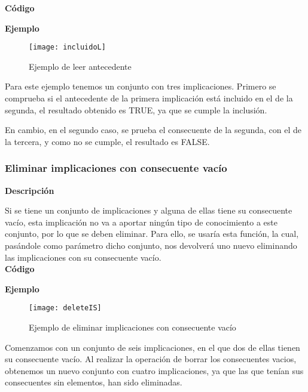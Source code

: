     \textbf{C\'odigo}

    
    \bigskip

    \textbf{Ejemplo}

    \begin{figure}[H]
        \centering
        \texttt{[image: incluidoL]}
        \caption{Ejemplo de leer antecedente}
        \label{fig:incluidoL}
    \end{figure}

    Para este ejemplo tenemos un conjunto con tres implicaciones. Primero se comprueba si el antecedente de la primera implicaci\'on 
    est\'a incluido en el de la segunda, el resultado obtenido es TRUE, ya que se cumple la inclusi\'on.

    En cambio, en el segundo caso, se prueba el consecuente de la segunda, con el de la tercera, y como no se cumple, el resultado es FALSE.



\subsubsection{Eliminar implicaciones con consecuente vac\'io}

    \textbf{Descripci\'on}

    Si se tiene un conjunto de implicaciones y alguna de ellas tiene su consecuente vac\'io, esta implicaci\'on no va a 
    aportar ning\'un tipo de conocimiento a este conjunto, por lo que se deben eliminar. Para ello, se usar\'ia esta funci\'on, 
    la cual, pas\'andole como par\'ametro dicho conjunto, nos devolver\'a uno nuevo eliminando las implicaciones con su consecuente 
    vac\'io.
    \\


    \textbf{C\'odigo}

    
    \bigskip

    \textbf{Ejemplo}

    \begin{figure}[H]
        \centering
        \texttt{[image: deleteIS]}
        \caption{Ejemplo de eliminar implicaciones con consecuente vac\'io}
        \label{fig:deleteIS}
    \end{figure}

    Comenzamos con un conjunto de seis implicaciones, en el que dos de ellas tienen su consecuente vac\'io. Al realizar la 
    operaci\'on de borrar los consecuentes vacios, obtenemos un nuevo conjunto con cuatro implicaciones, ya que las que ten\'ian 
    sus consecuentes sin elementos, han sido eliminadas.



